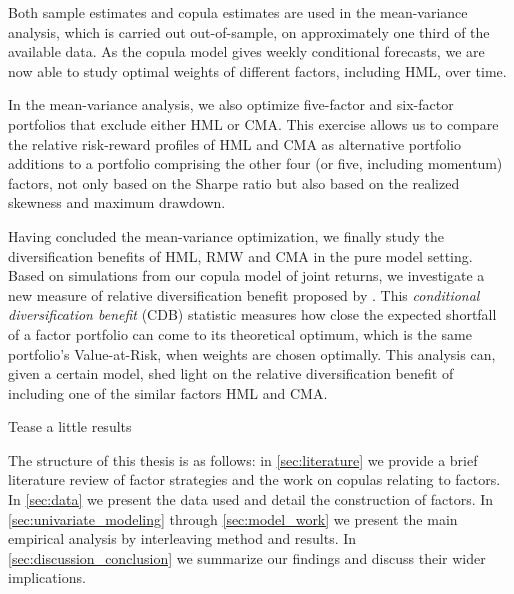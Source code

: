 Both sample estimates and copula estimates are used in the mean-variance analysis, which is carried out out-of-sample, on approximately one third of the available data. As the copula model gives weekly conditional forecasts, we are now able to study optimal weights of different factors, including HML, over time. 

In the mean-variance analysis, we also optimize five-factor and six-factor portfolios that exclude either HML or CMA. This exercise allows us to compare the relative risk-reward profiles of HML and CMA as alternative portfolio additions to a portfolio comprising the other four (or five, including momentum) factors, not only based on the Sharpe ratio but also based on the realized skewness and maximum drawdown. 

Having concluded the mean-variance optimization, we finally study the diversification benefits of HML, RMW and CMA in the pure model setting. Based on simulations from our copula model of joint returns, we investigate a new measure of relative diversification benefit proposed by \textcite{ChristoffersenErrunzaJacobLanglois2012}. This \emph{conditional diversification benefit} (CDB) statistic measures how close the expected shortfall of a factor portfolio can come to its theoretical optimum, which is the same portfolio's Value-at-Risk, when weights are chosen optimally. This analysis can, given a certain model, shed light on the relative diversification benefit of including one of the similar factors HML and CMA.

Tease a little results
 
The structure of this thesis is as follows: in \autoref{sec:literature} we provide a brief literature review of factor strategies and the work on copulas relating to factors. In \autoref{sec:data} we present the data used and detail the construction of factors. In \autoref{sec:univariate_modeling} through \autoref{sec:model_work}  we present the main empirical analysis by interleaving method and results. In \autoref{sec:discussion_conclusion} we summarize our findings and discuss their wider implications.